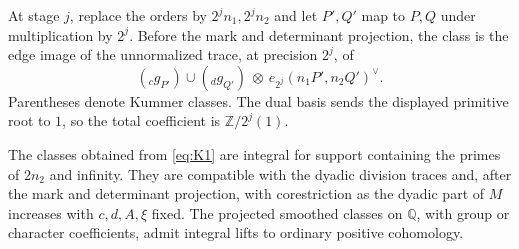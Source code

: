 At stage \(j\), replace the orders by \(2^j n_1,2^j n_2\) and let \(P',Q'\)
map to \(P,Q\) under multiplication by \(2^j\).  Before the mark and
determinant projection, the class is the edge image of the unnormalized
trace, at precision \(2^j\), of
\[
  ({}_c g_{P'})\cup({}_d g_{Q'})\ \otimes\
           e_{2^j}(n_1P',n_2Q')^\vee .                   \tag{K1}\label{eq:K1}
\]
Parentheses denote Kummer classes.  The dual basis sends the displayed
primitive root to \(1\), so the total coefficient is
\(\mathbb Z/2^j(1)\).

\begin{proposition}
\label{prop:siegel-integral}
The classes obtained from \eqref{eq:K1} are integral for support containing
the primes of \(2n_2\) and infinity.  They are compatible with the dyadic
division traces and, after the mark and determinant projection, with
corestriction as the dyadic part of \(M\) increases with \(c,d,A,\xi\)
fixed.  The projected smoothed classes on \(\mathbb Q\), with group or
character coefficients, admit integral lifts to ordinary positive
cohomology.
\end{proposition}

